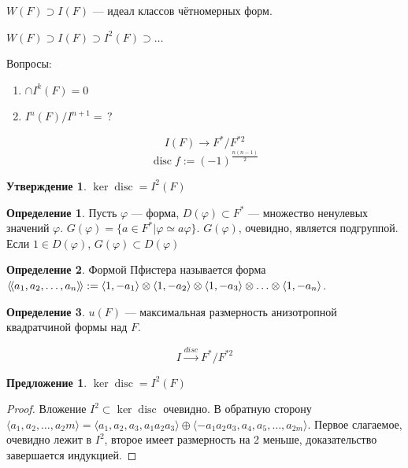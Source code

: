 \documentclass{article}
\newtheorem*{statement}{Утверждение}
\newtheorem*{proposition}{Предложение}
\theoremstyle{definition}
\newtheorem*{definition}{Определение}
\theoremstyle{remark}
\DeclareMathOperator{\disc}{disc}
\newcommand{\llangle}{\langle \hspace{-.5mm} \langle}
\newcommand{\rrangle}{\rangle \hspace{-.5mm} \rangle}
\begin{document}
$W(F) \supset I(F)$ --- идеал классов чётномерных форм.

$W(F) \supset I(F) \supset I^2(F) \supset \ldots$

Вопросы:
\begin{enumerate}
    \item $\cap I^k(F) = 0$
    \item $I^n(F) / I^{n + 1} = \,?$
\end{enumerate}

$$I(F) \rightarrow F^* / F^{*2}$$
$$\disc f := (-1)^{\frac{n(n - 1)}{2}}$$

\begin{statement}
    $\ker \disc = I^2(F)$
\end{statement}

\begin{definition}
    Пусть $\varphi$ --- форма, $D(\varphi) \subset F^*$ --- множество ненулевых значений $\varphi$. $G(\varphi) = \{a \in F^*| \varphi \simeq a \varphi\}$. $G(\varphi)$, очевидно, является подгруппой. Если $1 \in D(\varphi)$, $G(\varphi) \subset D(\varphi)$
\end{definition}

\begin{definition}
    Формой Пфистера называется форма $\llangle a_1, a_2, \ldots, a_n \rrangle := \langle 1, -a_1 \rangle \otimes \langle 1, -a_2 \rangle \otimes \langle 1, -a_3 \rangle \otimes \ldots \otimes \langle 1, -a_n \rangle$.
\end{definition}

\begin{definition}
    $u(F)$ --- максимальная размерность анизотропной квадратчиной формы над $F$.
\end{definition}

$$I \xrightarrow{disc} F^* / F^{*2}$$

\begin{proposition}
    $\ker \disc = I^2(F)$
\end{proposition}
\begin{proof}
    Вложение $I^2 \subset \ker \disc$ очевидно. В обратную сторону $\langle a_1, a_2, \ldots, a_2m \rangle = \langle a_1, a_2, a_3, a_1a_2a_3 \rangle \oplus \langle -a_1a_2a_3, a_4, a_5, \ldots, a_{2m} \rangle$. Первое слагаемое, очевидно лежит в $I^2$, второе имеет размерность на 2 меньше, доказательство завершается индукцией.
\end{proof}
\end{document}
